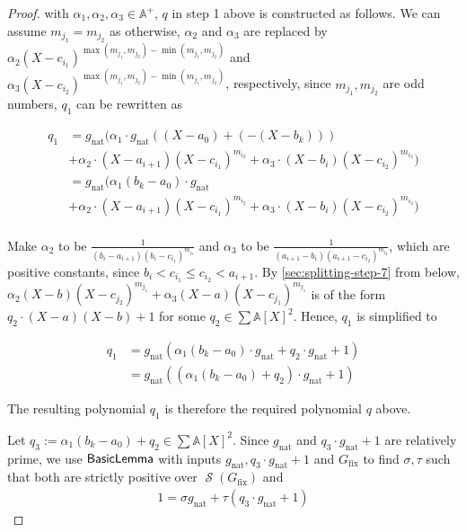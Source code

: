 \documentclass[preprint,12pt,authoryear]{elsarticle}
\newtheorem{proof}[theorem]{Proof}
\newcommand{\aX}{\mathbb{A}[X]}
\DeclareMathOperator{\semialgebraic}{\mathcal{S}}
\DeclareMathOperator{\algBasicLemma}{\sf BasicLemma}
\begin{document}
\begin{proof}
  {\noindent with $\alpha_1, \alpha_2, \alpha_3 \in \mathbb{A}^{+}$, $q$ in
    step 1 above is constructed as follows.}
  We can assume $m_{j_1} = m_{j_2}$ as otherwise, $\alpha_2$ and $\alpha_3$ are
  replaced by
  $\alpha_2(X-c_{i_1})^{\max(m_{j_1}, m_{j_2}) - \min(m_{j_1}, m_{j_2})}$ and
  $\alpha_3(X-c_{i_2})^{\max(m_{j_1}, m_{j_2}) - \min(m_{j_1}, m_{j_2})}$,
  respectively, since $m_{j_1}, m_{j_2}$ are odd numbers, $q_1$ can be rewritten
  as

  \begin{equation*}
    \label{sec:merging-step}
    \begin{split}
      q_1 &=
      g_{\mathrm{nat}}(\alpha_1 \cdot g_{\mathrm{nat}} ((X-a_0) +
        (-(X-b_k)))\\
      &+\alpha_2 \cdot (X-a_{i+1})(X-c_{i_1})^{m_{i_2}}
        +\alpha_3 \cdot (X-b_i)(X-c_{i_2})^{m_{i_2}})\\
      &= g_{\mathrm{nat}}(\alpha_1(b_k - a_0) \cdot g_{\mathrm{nat}}\\
      &+\alpha_2 \cdot (X-a_{i+1})(X-c_{i_1})^{m_{i_2}}
        +\alpha_3 \cdot (X-b_i)(X-c_{i_2})^{m_{i_2}})\\
    \end{split}
  \end{equation*}

  Make $\alpha_2$ to be $\frac{1}{(b_i-a_{i+1})(b_i-c_{i_1})^{m_{i_2}}}$ and
  $\alpha_3$ to be $\frac{1}{(a_{i+1}-b_i)(a_{i+1}-c_{i_2})^{m_{i_2}}}$, which
  are positive constants, since $b_i < c_{i_1} \leq c_{i_2} < a_{i+1}$. By
  \th\ref{sec:splitting-step-7} from below,
  $\alpha_2(X-b)(X-c_{j_2})^{m_{j_1}} +\alpha_3(X-a)(X-c_{j_1})^{m_{j_1}}$ is of
  the form $q_2 \cdot (X-a)(X-b) + 1$ for some $q_2 \in \sum{\aX}^2$. Hence,
  $q_1$ is simplified to
  \vspace{-4mm}

  \begin{equation}
    \label{sec:splitting-step-11}
    \begin{split}
      q_1
      &=g_{\mathrm{nat}}(\alpha_1(b_k - a_0) \cdot g_{\mathrm{nat}}
      + q_2 \cdot g_{\mathrm{nat}} + 1)\\
      &=g_{\mathrm{nat}}((\alpha_1(b_k - a_0) + q_2) \cdot g_{\mathrm{nat}} + 1)
    \end{split}
  \end{equation}

  \noindent
  The resulting polynomial $q_1$ is therefore the required polynomial $q$ above.

  Let $q_3 := \alpha_1(b_k - a_0) + q_2 \in \sum{\aX}^2$. Since
  $g_{\mathrm{nat}}$ and $q_3 \cdot g_{\mathrm{nat}} + 1$ are relatively prime,
  we use $\algBasicLemma$ with inputs
  $g_{\mathrm{nat}}, q_3 \cdot g_{\mathrm{nat}} + 1$ and $G_{\mathrm{fix}}$ to
  find $\sigma, \tau$ such that both are strictly positive over
  $\semialgebraic(G_{\mathrm{fix}})$ and
  \begin{equation}
    \label{sec:merging-step-4}
    \begin{split}
      1 = \sigma g_{\mathrm{nat}} + \tau (q_3 \cdot g_{\mathrm{nat}} + 1)
    \end{split}
  \end{equation}


\end{proof}
\end{document}

